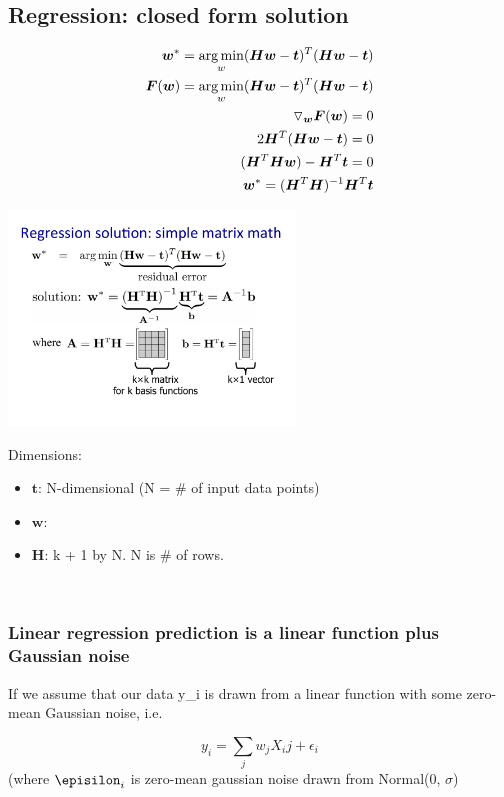 \subsection{Regression: closed form solution}
\begin{align*}
	\bm{w}^* = \operatorname*{arg\,min}_w (\bm{Hw} -\bm{t})^T (\bm{Hw} -\bm{t})  & \\
	\bm{F}(\bm{w}) =  \operatorname*{arg\,min}_w (\bm{Hw} -\bm{t})^T (\bm{Hw} -\bm{t}) & \\
	\triangledown_{\bm{w}}\bm{F}(\bm{w}) = 0 \\
	2 \bm{H}^T (\bm{H}\bm{w}-\bm{t}) = 0  & \\
	(\bm{H}^T\bm{H}\bm{w}) - \bm{H}^T\bm{t} = 0 & \\
	\bm{w}^* = (\bm{H}^T\bm{H})^{-1}\bm{H}^T\bm{t} &
\end{align*}

\includegraphics[width=3in]{figures/Regression_matrix_math.pdf}

Dimensions: 
\begin{itemize}
	\item $\bm{t}$:  N-dimensional  (N = \# of input data points) 
	\item $\bm{w}$: 
	\item $\bm{H}$: k + 1 by N.  N is \# of rows. 
\end{itemize}
\hfill \\

\subsubsection{Linear regression prediction is a linear function plus Gaussian noise}

If we assume that our data y_i is drawn from a linear function with some zero-mean Gaussian noise, i.e.

$$y_i = \sum_j w_j X_ij + \epsilon_i$$
(where $\episilon_i$ is zero-mean gaussian noise drawn from Normal(0, $\sigma$)

